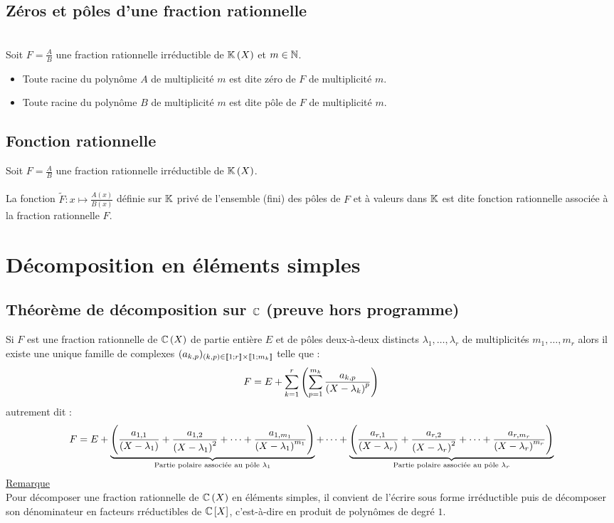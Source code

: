\subsection{Zéros et pôles d’une fraction rationnelle}
\begin{defprop}
    ~\\
    Soit \(F = \frac{A}{B}\) une fraction rationnelle irréductible de \(\mathbb{K}\left(X\right)\) et \(m \in \mathbb{N}\).
    \begin{itemize}
        \item Toute racine du polynôme \(A\) de multiplicité \(m\) est dite zéro de \(F\) de multiplicité \(m\).
        \item Toute racine du polynôme \(B\) de multiplicité \(m\) est dite pôle de \(F\) de multiplicité \(m\).
    \end{itemize}
\end{defprop}
\subsection{Fonction rationnelle}
\begin{defprop}
    Soit \(F = \frac{A}{B}\) une fraction rationnelle irréductible de \(\mathbb{K}\left(X\right)\).\\~\\
    La fonction \(\tilde{F} : x \mapsto \frac{A(x)}{B(x)}\) définie sur \(\mathbb{K}\) privé de l’ensemble (fini) des pôles de \(F\) et à valeurs dans \(\mathbb{K}\) est dite fonction rationnelle associée à la fraction rationnelle \(F\).
\end{defprop}
\section{Décomposition en éléments simples}
\subsection{Théorème de décomposition sur \(\mathbb{C}\) (preuve hors programme)}
\begin{defprop}
    Si \(F\) est une fraction rationnelle de \(\mathbb{C}\left(X\right)\) de partie entière \(E\) et de pôles deux-à-deux distincts \(\lambda_1, \dots , \lambda_r\) de multiplicités \(m_1, \dots , m_r\) alors il existe une unique famille de complexes \((a_{k,p})_{(k,p)\in \left\llbracket1;r\right\rrbracket\times \left\llbracket1;m_k\right\rrbracket}\) telle que :
\[F = E + \sum^r_{k=1}\left(\sum^{m_k}_{p=1} \frac{a_{k,p}}{\left(X - \lambda_k\right)^p}\right)\]
autrement dit :
\[F = E + \underbrace{\left(\frac{a_{1,1}}{\left(X - \lambda_1\right)} + \frac{a_{1,2}}{\left(X - \lambda_1\right)^2} + \dots + \frac{a_{1,m_1}}{\left(X - \lambda_1\right)^{m_1}}\right)}_{\text{Partie polaire associée au pôle } \lambda_1} + \dots + \underbrace{\left(\frac{a_{r,1}}{\left(X - \lambda_r\right)} + \frac{a_{r,2}}{\left(X - \lambda_r\right)^2} + \dots + \frac{a_{r,m_r}}{\left(X - \lambda_r\right)^{m_r}}\right)}_{\text{Partie polaire associée au pôle } \lambda_r}\]
    \underline{Remarque}\\
Pour décomposer une fraction rationnelle de \(\mathbb{C}\left(X\right)\) en éléments simples, il convient de l’écrire sous forme irréductible puis de décomposer son dénominateur en facteurs rréductibles de \(\mathbb{C} \left[X\right]\), c’est-à-dire en produit de polynômes de degré \(1\).
\end{defprop}

